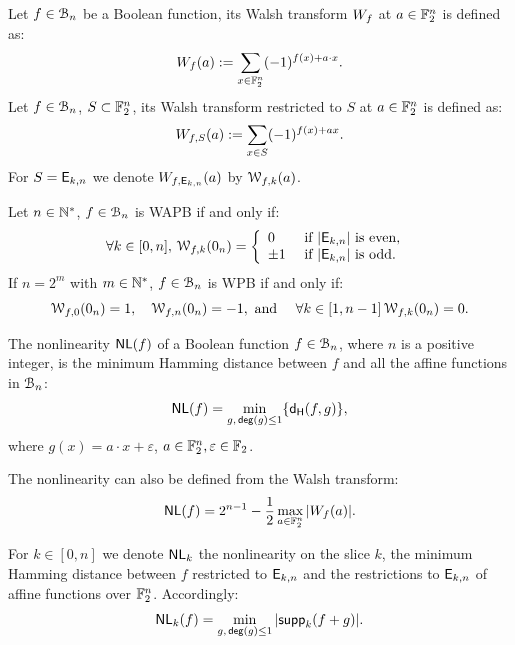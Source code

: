 \documentclass[11pt]{llncs}
\begin{document}
\iffalse
\begin{definition}\label{def:walsh_transform}
	Let $f\in \mathcal{B}_{n}$ be a Boolean function, its Walsh transform $W_{f}$ at $a \in \mathbb{F}_2^n$ is defined as:
	\[  W_{f} (a) := \sum_{x \in \mathbb{F}_2^n} (-1)^{f(x) +  a \cdot x }.\]
	Let $f\in \mathcal{B}_{n}$, $S \subset \mathbb{F}_2^n$, its Walsh transform restricted to $S$ at $a \in \mathbb{F}_2^n$ is defined as:
	\[  W_{f,S} (a) := \sum_{x\in S} (-1)^{f(x)+ax}.\]
	For $S=\mathsf{E}_{k,n}$ we denote $W_{f,\mathsf{E}_{k,n}} (a)$ by $\mathcal{W}_{f,k}(a)$.%
	
\end{definition}

\begin{Prop}\label{prop:WAPBWalsh}
	
Let $n\in \mathbb{N}^*$, $f\in \mathcal{B}_{n}$ is WAPB if and only if:
\[\forall k \in [0,n], \, \mathcal{W}_{f,k}(0_n)=   
\left \{
\begin{array}{l l}
0  & \text{ if } |\mathsf{E}_{k,n}| \text{ is even, } \\
\pm 1 & \text{ if }  |\mathsf{E}_{k,n}| \text{ is odd.}
\end{array}\right. \] 
If $n=2^m$ with $m\in \mathbb{N}^*$, $f\in \mathcal{B}_{n}$ is WPB if and only if:
\[\mathcal{W}_{f,0}(0_n)=1, \quad \mathcal{W}_{f,n}(0_n)=-1, \text{ and } \quad \forall k \in [1,n-1] \,  \mathcal{W}_{f,k}(0_n)=0. \] 
	
\end{Prop}

\begin{definition} \label{def:nl}
	The nonlinearity $\mathsf{NL}(f)$ of a Boolean function $f\in \mathcal{B}_n$, where $n$ is a positive integer, is the minimum Hamming distance between $f$ and all the affine functions in $\mathcal{B}_n$:
	\[ \mathsf{NL}(f) = \min_{g,\, \mathsf{deg}(g)\leq 1} \{ \mathsf{d_H}(f,g) \}{,} \]
	where $g(x)=a\cdot x+\varepsilon$, $a\in \mathbb{F}_2^n, \varepsilon\in \mathbb{F}_2$. 
	
	The nonlinearity can also be defined from the Walsh transform:
	\[ \mathsf{NL}(f) = 2^{n-1}- \frac{1}{2} \max_{a\in \mathbb{F}_2^n}{|W_{f}(a)|}. \]
	
	
	For $k\in [0,n]$ we denote $\mathsf{NL}_{k}$ the nonlinearity on the slice $k$, the minimum Hamming distance between $f$ restricted to $\mathsf{E}_{k,n}$ and the restrictions to $\mathsf{E}_{k,n}$ of affine functions over $\mathbb{F}_2^n$. 
	Accordingly: 
	\[\mathsf{NL}_{k}(f)=\min_{g,\, \mathsf{deg}(g)\leq 1} |\mathsf{supp}_{k}(f+g)|.\]
\end{definition}
\end{document}
